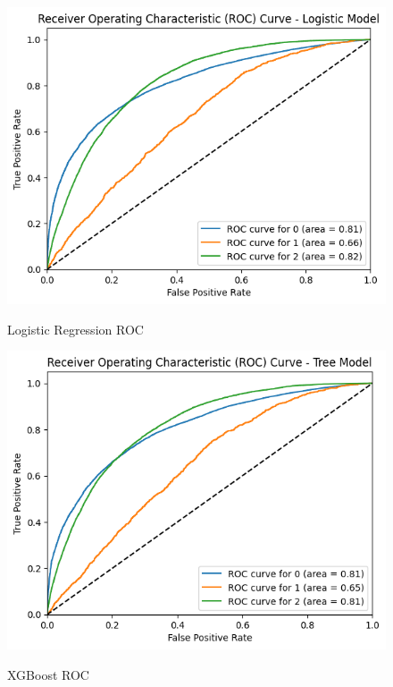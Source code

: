 \documentclass[conference]{IEEEtran}
\begin{document}
    \begin{figure}[h]
        \centering
        \includegraphics[scale=0.39]{logROC.png}
        \label{fig:logROC}
        \caption{Logistic Regression ROC}
    \end{figure}
    
    \begin{figure}[h]
        \centering
        \includegraphics[scale=0.39]{treeROC.png}
        \label{fig:treeROC}
        \caption{XGBoost ROC}
    \end{figure}
\end{document}
